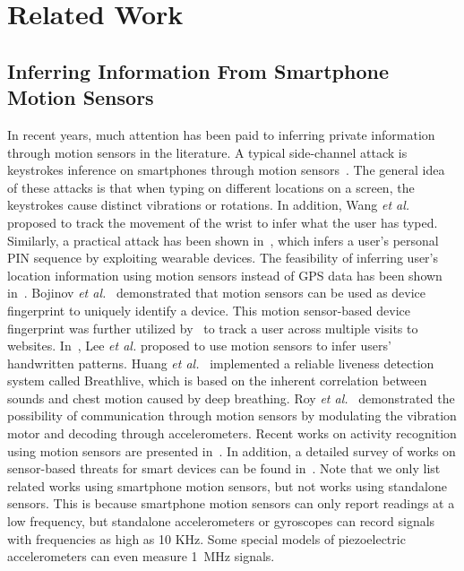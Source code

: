
\section{Related Work}

\subsection{Inferring  Information From Smartphone Motion Sensors}
%
In recent years, much attention has been paid to inferring private information  through motion sensors in the literature.
%
A typical side-channel attack is keystrokes inference on smartphones through motion sensors~\cite{owusu2012accessory,miluzzo2012tapprints}. 
%
The general idea of these attacks is that when typing on different locations on a screen, the keystrokes cause distinct vibrations or rotations. 
%
In addition, Wang \emph{et al.}~\cite{wang2015mole} proposed to track the movement of the wrist to infer what the user has typed.
% 
Similarly, a practical attack has been shown in~\cite{wang2016friend}, which infers a user’s personal PIN sequence by exploiting wearable devices.
%
The feasibility of inferring user’s location information using motion sensors instead of GPS data has been shown in~\cite{liang2017location,han2012accomplice}.
%
Bojinov \emph{et al.}~\cite{bojinov2014mobile} demonstrated that motion sensors can be used as device fingerprint to uniquely identify a device. 
%
This motion sensor-based device fingerprint was further utilized by~\cite{das2016tracking} to track a user across multiple visits to websites.
%
In~\cite{lee2018inferring}, Lee \emph{et al.} proposed to use motion sensors to infer users' handwritten patterns.
%
Huang \emph{et al.}~\cite{huang2018breathlive} implemented a reliable liveness detection system called Breathlive, which is based on the inherent correlation between sounds and chest motion caused by deep breathing.
%
Roy \emph{et al.}~\cite{roy2015ripple} demonstrated the possibility of communication through motion sensors by modulating the vibration motor and decoding through accelerometers. 
%
Recent works on activity recognition using motion sensors are presented in~\cite{shoaib2015survey,wang2019deep}.
%
In addition, a detailed survey of works on sensor-based threats for smart devices can be found in~\cite{sikder2018survey, crager2017information}.
%
Note that we only list related works using smartphone motion sensors, but not works using standalone sensors. This is because smartphone motion sensors can only report readings at a low frequency, but standalone accelerometers or gyroscopes can record signals with frequencies as high as 10 KHz. Some special models of piezoelectric accelerometers can even measure 1~MHz signals.

